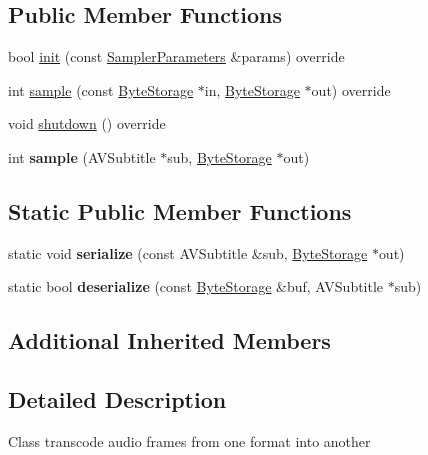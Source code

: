 \subsection*{Public Member Functions}
\begin{DoxyCompactItemize}
\item 
bool \hyperlink{classffmpeg_1_1SubtitleSampler_a352ab0faeb54596825ca1edd4406b72c}{init} (const \hyperlink{structffmpeg_1_1SamplerParameters}{Sampler\+Parameters} \&params) override
\item 
int \hyperlink{classffmpeg_1_1SubtitleSampler_ae4d48345d38512ece2999964731264dc}{sample} (const \hyperlink{classffmpeg_1_1ByteStorage}{Byte\+Storage} $\ast$in, \hyperlink{classffmpeg_1_1ByteStorage}{Byte\+Storage} $\ast$out) override
\item 
void \hyperlink{classffmpeg_1_1SubtitleSampler_aa2558e487cd9bb0438c5c95a6808ace7}{shutdown} () override
\item 
\mbox{\label{classffmpeg_1_1SubtitleSampler_a12578c417a4e7c309a7677c68d6e2e2b}} 
int {\bfseries sample} (A\+V\+Subtitle $\ast$sub, \hyperlink{classffmpeg_1_1ByteStorage}{Byte\+Storage} $\ast$out)
\end{DoxyCompactItemize}
\subsection*{Static Public Member Functions}
\begin{DoxyCompactItemize}
\item 
\mbox{\label{classffmpeg_1_1SubtitleSampler_a4e5c555c0cea43b9c7efa2b86a2e2d54}} 
static void {\bfseries serialize} (const A\+V\+Subtitle \&sub, \hyperlink{classffmpeg_1_1ByteStorage}{Byte\+Storage} $\ast$out)
\item 
\mbox{\label{classffmpeg_1_1SubtitleSampler_ab863d1a36100774d0a380168b3f97dc6}} 
static bool {\bfseries deserialize} (const \hyperlink{classffmpeg_1_1ByteStorage}{Byte\+Storage} \&buf, A\+V\+Subtitle $\ast$sub)
\end{DoxyCompactItemize}
\subsection*{Additional Inherited Members}


\subsection{Detailed Description}
Class transcode audio frames from one format into another 

